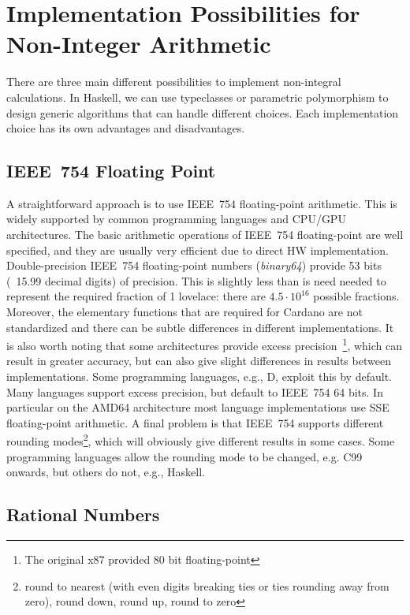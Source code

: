 \documentclass[11pt,a4paper,dvipsnames,twosided]{article}
\newcommand{\khcomment}[1]{\todo[color=blue!20]{KH: #1}}
\theoremstyle{definition}
\theoremstyle{definition}
\begin{document}
\section{Implementation Possibilities for Non-Integer Arithmetic}
\label{sec:impl-poss}

There are three main different possibilities to implement non-integral
calculations. In Haskell, we can use typeclasses or parametric polymorphism
to design generic algorithms that can handle different choices. Each implementation choice has its
own advantages and disadvantages.

\subsection{IEEE~754 Floating Point}
\label{sec:ieee-754-floating}

A straightforward approach is to use IEEE~754 floating-point arithmetic.  This is
widely supported by common programming languages and CPU/GPU architectures.
%
The basic arithmetic operations of IEEE~754 floating-point are well specified,
and they are usually very efficient due to direct HW implementation.
%
Double-precision IEEE~754 floating-point numbers (\emph{binary64}) provide 53 bits (~15.99 decimal digits) of
precision.  This is slightly less than is need needed to represent the
required fraction of 1 lovelace: there are $4.5\cdot10^{16}$ possible fractions.
Moreover, the  elementary functions that are required for Cardano are not standardized and there can be
subtle differences in different implementations. It is also worth noting that some architectures
provide excess precision~\footnote{The original x87 provided 80 bit
  floating-point}, which can result in greater accuracy, but can also give slight differences in results
between implementations. Some programming languages, e.g., D, exploit this by default. Many
languages support excess precision, but default to IEEE~754 64 bits. In
particular on the AMD64 architecture most language implementations use SSE floating-point arithmetic.
A final problem is that IEEE~754 supports different rounding modes\footnote{round to nearest (with even digits breaking ties or ties rounding away from zero), round down, round up, round to zero},  which will obviously give
different results in some cases.  Some programming languages allow the rounding mode to be changed, e.g. C99 onwards\khcomment{check}, but others do
not, e.g., Haskell.

\subsection{Rational Numbers}
\label{sec:rational-numbers}
\end{document}
